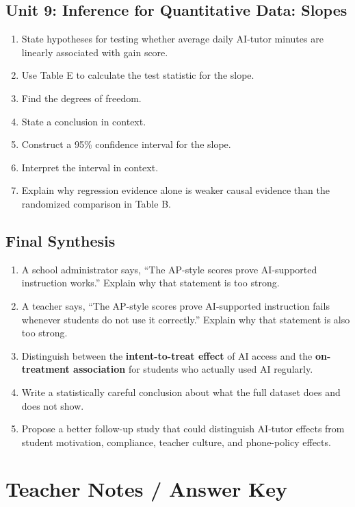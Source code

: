 \documentclass[11pt]{article}
\begin{document}
\subsection*{Unit 9: Inference for Quantitative Data: Slopes}
\begin{enumerate}[resume,leftmargin=*]
\item State hypotheses for testing whether average daily AI-tutor
minutes are linearly associated with gain score.
\item Use Table E to calculate the test statistic for the slope.
\item Find the degrees of freedom.
\item State a conclusion in context.
\item Construct a 95\% confidence interval for the slope.
\item Interpret the interval in context.
\item Explain why regression evidence alone is weaker causal evidence
than the randomized comparison in Table B.
\end{enumerate}

\subsection*{Final Synthesis}
\begin{enumerate}[resume,leftmargin=*]
\item A school administrator says, ``The AP-style scores prove
AI-supported instruction works.'' Explain why that statement is
too strong.
\item A teacher says, ``The AP-style scores prove AI-supported
instruction fails whenever students do not use it correctly.''
Explain why that statement is also too strong.
\item Distinguish between the \textbf{intent-to-treat effect} of AI
access and the \textbf{on-treatment association} for students who
actually used AI regularly.
\item Write a statistically careful conclusion about what the full
dataset does and does not show.
\item Propose a better follow-up study that could distinguish
AI-tutor effects from student motivation, compliance, teacher
culture, and phone-policy effects.
\end{enumerate}

\newpage
\section{Teacher Notes / Answer Key}
\end{document}
